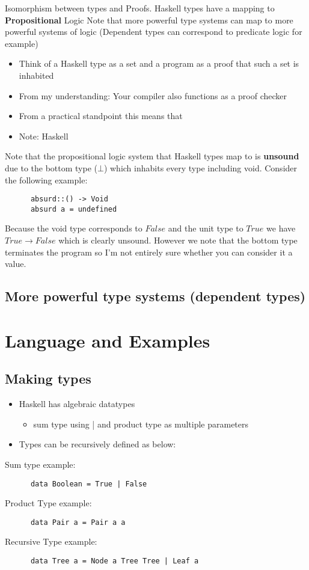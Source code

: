 \documentclass{article}
\begin{document}
Isomorphism between types and Proofs. Haskell types have a mapping to \textbf{Propositional} Logic
Note that more powerful type systems can map to more powerful systems of logic (Dependent types can
correspond to predicate logic for example)
\begin{itemize}
  \item Think of a Haskell type as a set and a program as a proof that such a set is inhabited
  \item From my understanding: Your compiler also functions as a proof checker
  \item From a practical standpoint this means that 
  \item Note: Haskell
\end{itemize}
     Note that the propositional logic system that Haskell types map to is \textbf{unsound}
     due to the bottom type ($\bot$) which inhabits every type including void. Consider the
     following example:
    \begin{verbatim}
      absurd::() -> Void
      absurd a = undefined
    \end{verbatim}
      Because the void type corresponds to $False$ and the unit type to $True$
      we have $True \rightarrow False$ which is clearly unsound. However we note
      that the bottom type terminates the program so I'm not entirely sure whether
      you can consider it a value.

\subsection{More powerful type systems (dependent types)}


\section{Language and Examples}

\subsection{Making types}
\begin{itemize}
  \item  Haskell has algebraic datatypes 
    \begin{itemize}
      \item sum type using | and product type as multiple parameters
   \end{itemize}
 \item Types can be recursively defined as below:
\end{itemize}
Sum type example:
    \begin{verbatim}
      data Boolean = True | False
    \end{verbatim}
Product Type example:
    \begin{verbatim}
      data Pair a = Pair a a
    \end{verbatim}
Recursive Type example:
    \begin{verbatim}
      data Tree a = Node a Tree Tree | Leaf a
    \end{verbatim}
\end{document}
